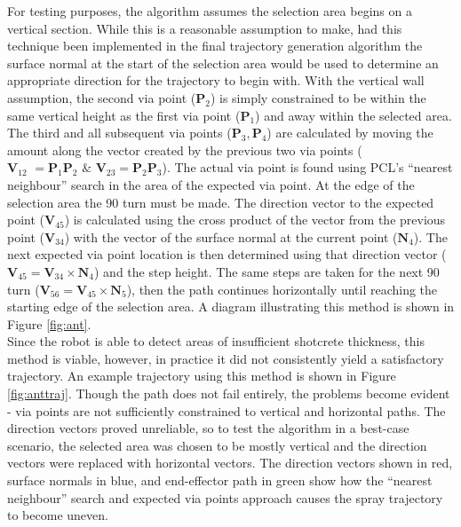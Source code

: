 For testing purposes, the algorithm assumes the selection area begins on a vertical section. While this is a reasonable assumption to make, had this technique been implemented in the final trajectory generation algorithm the surface normal at the start of the selection area would be used to determine an appropriate direction for the trajectory to begin with. With the vertical wall assumption, the second via point ($\mathbf{P}_2$) is simply constrained to be within the same vertical height as the first via point ($\mathbf{P}_1$) and  away within the selected area. The third and all subsequent via points ($\mathbf{P}_3,\mathbf{P}_4$) are calculated by moving the  amount along the vector created by the previous two via points ($\mathbf{V}_{12}\hspace{4pt} = \mathbf{P}_1\mathbf{P}_2\hspace{4pt} \& \hspace{4pt}\mathbf{V}_{23} = \mathbf{P}_2\mathbf{P}_3$). The actual via point is found using PCL's  ``nearest neighbour'' search in the area of the expected via point. At the edge of the selection area the 90\degree\hspace{0pt} turn must be made. The direction vector to the expected point ($\mathbf{V}_{45}$) is calculated using the cross product of the vector from the previous point ($\mathbf{V}_{34}$) with the vector of the surface normal at the current point ($\mathbf{N}_4$). The next expected via point location is then determined using that direction vector ($\mathbf{V}_{45} = \mathbf{V}_{34} \times \mathbf{N}_4$) and the step height. The same steps are taken for the next 90\degree\hspace{0pt} turn ($\mathbf{V}_{56} = \mathbf{V}_{45} \times \mathbf{N}_5$), then the path continues horizontally until reaching the starting edge of the selection area. A diagram illustrating this method is shown in Figure \ref{fig:ant}.\\


Since the robot is able to detect areas of insufficient shotcrete thickness, this method is viable, however, in practice it did not consistently yield a satisfactory trajectory. An example trajectory using this method is shown in Figure \ref{fig:anttraj}. Though the path does not fail entirely, the problems become evident - via points are not sufficiently constrained to vertical and horizontal paths. The direction vectors proved unreliable, so to test the algorithm in a best-case scenario, the selected area was chosen to be mostly vertical and the direction vectors were replaced with horizontal vectors. The direction vectors shown in red, surface normals in blue, and end-effector path in green show how the ``nearest neighbour'' search and expected via points approach causes the spray trajectory to become uneven.\\

